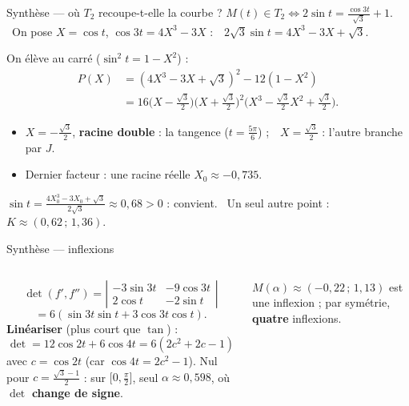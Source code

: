 \documentclass[aspectratio=169,11pt]{beamer}
\newcommand{\dt}[1]{\left|\begin{matrix}#1\end{matrix}\right|}
\begin{document}
\begin{frame}{Synthèse --- où $T_2$ recoupe-t-elle la courbe ?}
$M(t)\in T_2\iff2\sin t=\frac{\cos3t}{\sqrt3}+1$. \ On pose $X=\cos t$, $\cos3t=4X^3-3X$ :\ \ $2\sqrt3\sin t=4X^3-3X+\sqrt3$.
\pause
\par\smallskip
On élève au carré ($\sin^2t=1-X^2$) :
\begin{align*}P(X)&=(4X^3-3X+\sqrt3)^2-12(1-X^2)\\&=16\Big(X-\tfrac{\sqrt3}2\Big)\Big(X+\tfrac{\sqrt3}2\Big)^2\Big(X^3-\tfrac{\sqrt3}2X^2+\tfrac{\sqrt3}2\Big).\end{align*}
\pause
\begin{itemize}
\item $X=-\frac{\sqrt3}2$, \textbf{racine double} : la tangence ($t=\frac{5\pi}6$) ;\ \ $X=\frac{\sqrt3}2$ : l'autre branche par $J$.
\item Dernier facteur : une racine réelle $X_0\approx-0{,}735$.
\end{itemize}
\pause
\begin{PIEGE}
$\sin t=\frac{4X_0^3-3X_0+\sqrt3}{2\sqrt3}\approx0{,}68>0$ : convient. \ Un seul autre point : $K\approx(0{,}62\,;\,1{,}36)$.
\end{PIEGE}
\end{frame}

\begin{frame}{Synthèse --- inflexions}
\begin{columns}[c]
\[\det(f',f'')=\dt{-3\sin3t&-9\cos3t\\2\cos t&-2\sin t}\]\[=6(\sin3t\sin t+3\cos3t\cos t).\]
\pause
\textbf{Linéariser} (plus court que $\tan$) :
\[\det=12\cos2t+6\cos4t=6(2c^2+2c-1)\]
avec $c=\cos2t$ (car $\cos4t=2c^2-1$).
\pause
Nul pour $c=\frac{\sqrt3-1}2$ : sur $\big[0,\frac\pi2\big]$, seul $\alpha\approx0{,}598$, où $\det$ \textbf{change de signe}.
\pause
\begin{RETENIR}
$M(\alpha)\approx(-0{,}22\,;\,1{,}13)$ est une inflexion ; par symétrie, \textbf{quatre} inflexions.
\end{RETENIR}
\centering{}
\end{columns}
\end{frame}
\end{document}
